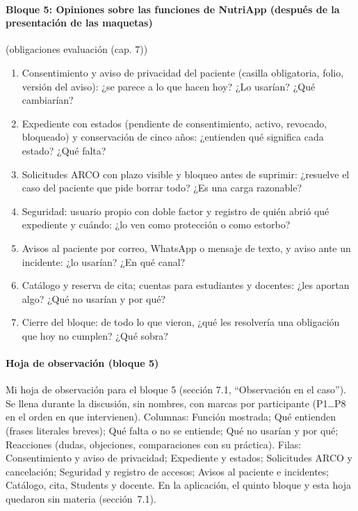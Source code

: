 \documentclass[12pt, a4paper]{article}
\begin{document}
\paragraph{Bloque 5: Opiniones sobre las funciones de NutriApp (después de la presentación de las maquetas)} (obligaciones evaluación (cap. 7))
\begin{enumerate}
  \item Consentimiento y aviso de privacidad del paciente (casilla obligatoria, folio, versión del aviso): ¿se parece a lo que hacen hoy? ¿Lo usarían? ¿Qué cambiarían?
  \item Expediente con estados (pendiente de consentimiento, activo, revocado, bloqueado) y conservación de cinco años: ¿entienden qué significa cada estado? ¿Qué falta?
  \item Solicitudes ARCO con plazo visible y bloqueo antes de suprimir: ¿resuelve el caso del paciente que pide borrar todo? ¿Es una carga razonable?
  \item Seguridad: usuario propio con doble factor y registro de quién abrió qué expediente y cuándo: ¿lo ven como protección o como estorbo?
  \item Avisos al paciente por correo, Whats\-App o mensaje de texto, y aviso ante un incidente: ¿lo usarían? ¿En qué canal?
  \item Catálogo y reserva de cita; cuentas para estudiantes y docentes: ¿les aportan algo? ¿Qué no usarían y por qué?
  \item Cierre del bloque: de todo lo que vieron, ¿qué les resolvería una obligación que hoy no cumplen? ¿Qué sobra?
\end{enumerate}
 
\paragraph{Hoja de observación (bloque 5)}
Mi hoja de observación para el bloque 5 (sección 7.1, ``Observación en el caso''). Se llena durante la discusión, sin nombres, con marcas por participante (P1…P8 en el orden en que intervienen).
Columnas: Función mostrada; Qué entienden (frases literales breves); Qué falta o no se entiende; Qué no usarían y por qué; Reacciones (dudas, objeciones, comparaciones con su práctica). Filas: Consentimiento y aviso de privacidad; Expediente y estados; Solicitudes ARCO y cancelación; Seguridad y registro de accesos; Avisos al paciente e incidentes; Catálogo, cita, Students y docente. En la aplicación, el quinto bloque y esta hoja quedaron sin materia (sección~7.1).
 
\end{document}
